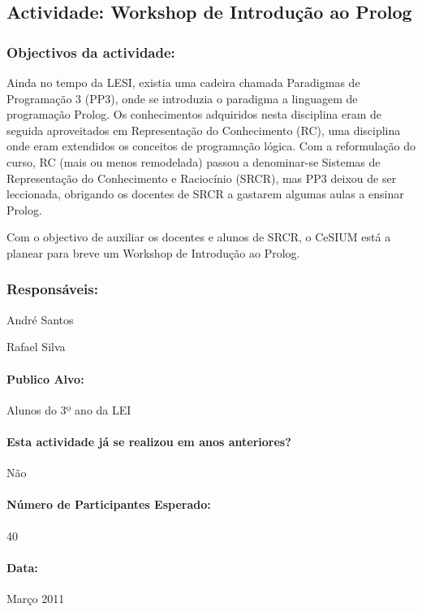 \subsection{Actividade: Workshop  de Introdução ao Prolog} %

\subsubsection*{Objectivos da actividade:}
Ainda no tempo da LESI, existia uma cadeira chamada Paradigmas de Programação 3 (PP3), onde se introduzia o paradigma a linguagem de programação Prolog. Os conhecimentos adquiridos nesta disciplina eram de seguida aproveitados em Representação do Conhecimento (RC), uma disciplina onde eram extendidos os conceitos de programação lógica. Com a reformulação do curso, RC (mais ou menos remodelada) passou a denominar-se Sistemas de Representação do Conhecimento e Raciocínio (SRCR), mas PP3 deixou de ser leccionada, obrigando os docentes de SRCR a gastarem algumas aulas a ensinar Prolog.

Com o objectivo de auxiliar os docentes e alunos de SRCR, o CeSIUM está a planear para breve um Workshop de Introdução ao Prolog.
\subsubsection*{Responsáveis:}
\begin{itemizedash}
	\item{André Santos}
	\item{Rafael Silva}
\end{itemizedash}

\paragraph{Publico Alvo: }
Alunos do 3º ano da LEI

\paragraph{Esta actividade já se realizou em anos anteriores?}
Não

\paragraph{Número de Participantes Esperado:}
40

\paragraph{Data:} Março 2011

